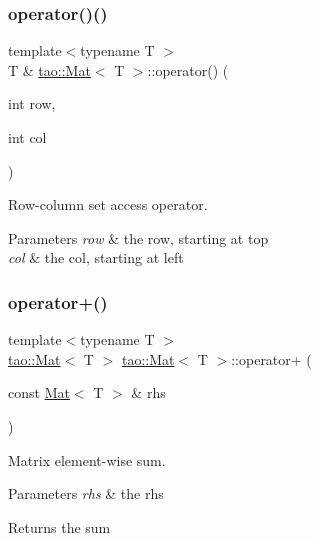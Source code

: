 \subsubsection{\texorpdfstring{operator()()}{operator()()}\hspace{0.1cm}{\footnotesize\ttfamily [2/2]}}
{\footnotesize\ttfamily template$<$typename T $>$ \\
T \& \mbox{\hyperlink{classtao_1_1_mat}{tao\+::\+Mat}}$<$ T $>$\+::operator() (\begin{DoxyParamCaption}\item[{int}]{row,  }\item[{int}]{col }\end{DoxyParamCaption})}



Row-\/column set access operator. 


\begin{DoxyParams}{Parameters}
{\em row} & the row, starting at top \\
\hline
{\em col} & the col, starting at left \\
\hline
\end{DoxyParams}
\mbox{\label{classtao_1_1_mat_a84cc1217fbedd04adbcc6068d7fd493a}} 
\subsubsection{\texorpdfstring{operator+()}{operator+()}}
{\footnotesize\ttfamily template$<$typename T $>$ \\
\mbox{\hyperlink{classtao_1_1_mat}{tao\+::\+Mat}}$<$ T $>$ \mbox{\hyperlink{classtao_1_1_mat}{tao\+::\+Mat}}$<$ T $>$\+::operator+ (\begin{DoxyParamCaption}\item[{const \mbox{\hyperlink{classtao_1_1_mat}{Mat}}$<$ T $>$ \&}]{rhs }\end{DoxyParamCaption})}



Matrix element-\/wise sum. 


\begin{DoxyParams}{Parameters}
{\em rhs} & the rhs \\
\hline
\end{DoxyParams}
\begin{DoxyReturn}{Returns}
the sum 
\end{DoxyReturn}
\mbox{\label{classtao_1_1_mat_a8033892f80dec7742fbae2d4142718c9}} 
